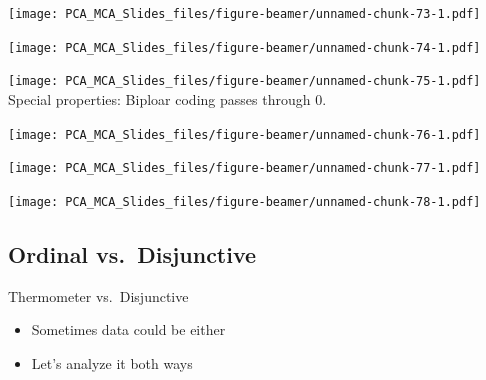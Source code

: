 \documentclass[
  ignorenonframetext,
]{beamer}
\providecommand{\tightlist}{%
  \setlength{\itemsep}{0pt}\setlength{\parskip}{0pt}}
\begin{document}
\begin{frame}

\texttt{[image: PCA\_MCA\_Slides\_files/figure-beamer/unnamed-chunk-73-1.pdf]}

\end{frame}

\begin{frame}

\texttt{[image: PCA\_MCA\_Slides\_files/figure-beamer/unnamed-chunk-74-1.pdf]}

\end{frame}

\begin{frame}

\texttt{[image: PCA\_MCA\_Slides\_files/figure-beamer/unnamed-chunk-75-1.pdf]}
Special properties: Biploar coding passes through 0.

\end{frame}

\begin{frame}

\texttt{[image: PCA\_MCA\_Slides\_files/figure-beamer/unnamed-chunk-76-1.pdf]}

\end{frame}

\begin{frame}

\texttt{[image: PCA\_MCA\_Slides\_files/figure-beamer/unnamed-chunk-77-1.pdf]}

\end{frame}

\begin{frame}

\texttt{[image: PCA\_MCA\_Slides\_files/figure-beamer/unnamed-chunk-78-1.pdf]}

\end{frame}

\hypertarget{ordinal-vs.-disjunctive}{%
\subsection{Ordinal vs.~Disjunctive}\label{ordinal-vs.-disjunctive}}

\begin{frame}{Thermometer vs.~Disjunctive}
\protect\hypertarget{thermometer-vs.-disjunctive}{}

\begin{itemize}[<+->]
\tightlist
\item
  Sometimes data could be either
\item
  Let's analyze it both ways
\end{itemize}

\end{frame}
\end{document}
